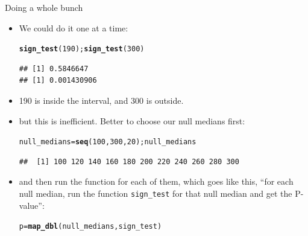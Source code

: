 \documentclass[unknownkeysallowed]{beamer}\usepackage[]{graphicx}\usepackage[]{color}
\makeatletter
\newcommand{\hlnum}[1]{\textcolor[rgb]{0.686,0.059,0.569}{#1}}%
\newcommand{\hlstd}[1]{\textcolor[rgb]{0.345,0.345,0.345}{#1}}%
\newcommand{\hlkwb}[1]{\textcolor[rgb]{0.69,0.353,0.396}{#1}}%
\newcommand{\hlkwd}[1]{\textcolor[rgb]{0.737,0.353,0.396}{\textbf{#1}}}%
\newenvironment{kframe}{%
 \def\at@end@of@kframe{}%
 \ifinner\ifhmode%
  \def\at@end@of@kframe{\end{minipage}}%
  \begin{minipage}{\columnwidth}%
 \fi\fi%
 \def\FrameCommand##1{\hskip\@totalleftmargin \hskip-\fboxsep
 \colorbox{shadecolor}{##1}\hskip-\fboxsep
     \hskip-\linewidth \hskip-\@totalleftmargin \hskip\columnwidth}%
 \MakeFramed {\advance\hsize-\width
   \@totalleftmargin\z@ \linewidth\hsize
   \@setminipage}}%
 {\par\unskip\endMakeFramed%
 \at@end@of@kframe}
\newenvironment{knitrout}{}{} %
\makeatother
\begin{document}
\begin{frame}[fragile]{Doing a whole bunch}
  
  \begin{itemize}
  \item We could do it one at a time:
    
\begin{knitrout}
\color{fgcolor}\begin{kframe}
\begin{alltt}
\hlkwd{sign_test}\hlstd{(}\hlnum{190}\hlstd{) ;} \hlkwd{sign_test}\hlstd{(}\hlnum{300}\hlstd{)}
\end{alltt}
\begin{verbatim}
## [1] 0.5846647
## [1] 0.001430906
\end{verbatim}
\end{kframe}
\end{knitrout}
\item 190 is inside the interval, and 300 is outside.
\item but this is inefficient. Better to choose our null medians first:
\begin{knitrout}
\color{fgcolor}\begin{kframe}
\begin{alltt}
\hlstd{null_medians}\hlkwb{=}\hlkwd{seq}\hlstd{(}\hlnum{100}\hlstd{,}\hlnum{300}\hlstd{,}\hlnum{20}\hlstd{) ; null_medians}
\end{alltt}
\begin{verbatim}
##  [1] 100 120 140 160 180 200 220 240 260 280 300
\end{verbatim}
\end{kframe}
\end{knitrout}
\item and then run the function for each of them, which goes like
  this, ``for each null median, run the function \texttt{sign\_test} for
  that null median and get the P-value'':
  
\begin{knitrout}
\color{fgcolor}\begin{kframe}
\begin{alltt}
\hlstd{p}\hlkwb{=}\hlkwd{map_dbl}\hlstd{(null_medians,sign_test)}
\end{alltt}
\end{kframe}
\end{knitrout}
  
  
  \end{itemize}
  
\end{frame}
\end{document}
